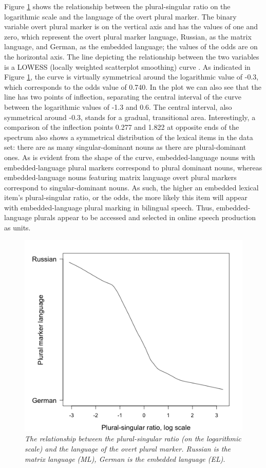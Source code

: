 Figure \ref{fig:6:2} shows the relationship between the plural-singular ratio on the logarithmic scale and the language of the overt plural marker. The binary variable overt plural marker is on the vertical axis and has the values of one and zero, which represent the overt plural marker language, Russian, as the matrix language, and German, as the embedded language; the values of the odds are on the horizontal axis. The line depicting the relationship between the two variables is a LOWESS (locally weighted scatterplot smoothing) curve \citep{lowess}. As indicated in Figure \ref{fig:6:2}, the curve is virtually symmetrical around the logarithmic value of -0.3, which corresponds to the odds value of 0.740. In the plot we can also see that the line has two points of inflection, separating the central interval of the curve between the logarithmic values of -1.3 and 0.6. The central interval, also symmetrical around -0.3, stands for a gradual, transitional area. Interestingly, a comparison of the inflection points 0.277 and 1.822 at opposite ends of the spectrum also shows a symmetrical distribution of the lexical items in the data set: there are as many singular-dominant nouns as there are plural-dominant ones. As is evident from the shape of the curve, embedded-language nouns with embedded-language plural markers correspond to plural dominant nouns, whereas embedded-language nouns  featuring matrix language overt plural markers correspond to singular-dominant nouns. As such, the higher an embedded lexical item’s plural-singular ratio, or the odds, the more likely this item will appear with embedded-language plural marking in bilingual speech. Thus, embedded-language plurals appear to be accessed and selected in online speech production as units.

\begin{figure} %
\centering
	   	    	\includegraphics[scale=0.5]{figures/6-Figure_2.png}
\vspace{2mm}
\caption{\textit{The relationship between the plural-singular ratio (on the logarithmic scale) and the language of the overt plural marker. Russian is the matrix language (ML), German is the embedded language (EL)}.}\label{fig:6:2}
\end{figure}

